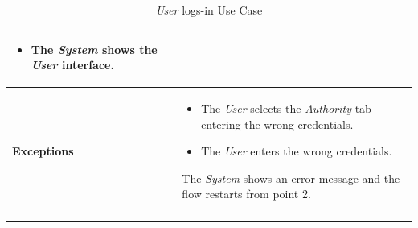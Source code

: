 \documentclass {article}
\begin{document}
\begin{longtable}{| p{3 cm} | p{10.5 cm} |}
\begin{itemize}
				\item The {\it System} shows the {\it User} interface.
			\end{itemize}
			\\
			\hline
			{\bf Exceptions} & 	
			\begin{itemize}
				\item The {\it User} selects the {\it Authority} tab entering the wrong credentials. 
				\item The {\it User} enters the wrong credentials.
			\end{itemize}
			The {\it System} shows an error message and the flow restarts from point 2. \\
			\hline
			\caption{{\it User} logs-in Use Case}
			\end{longtable}
			
\end{document}
